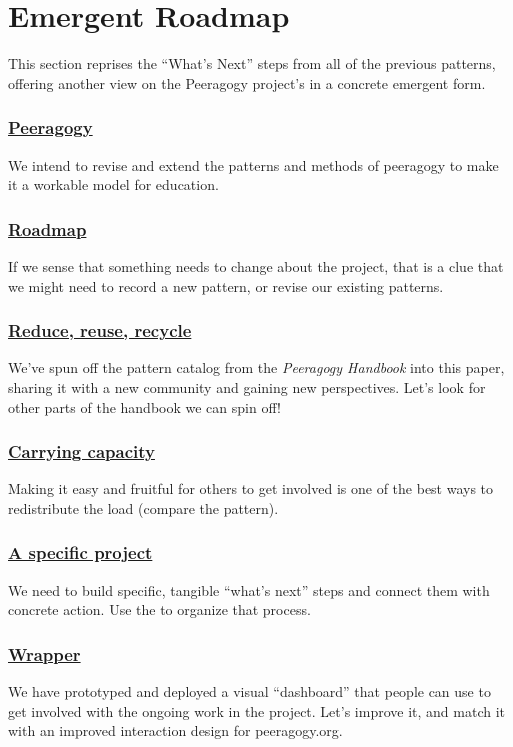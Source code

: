 \section{Emergent Roadmap} \label{sec:Distributed_Roadmap}

This section reprises the ``What's Next'' steps from all of the previous
patterns, offering another view on the Peeragogy project's
 in a concrete emergent form.

\subsubsection*{\hyperref[sec:Peeragogy]{Peeragogy}} 
 We intend to revise and extend the patterns and methods of peeragogy to make it a workable model for education.

\subsubsection*{\hyperref[sec:Roadmap]{Roadmap}} 
If we sense that something needs to change about the project, that is a clue that we might need to record a new pattern, or revise our existing patterns.

\subsubsection*{\hyperref[sec:Reduce, reuse, recycle]{Reduce, reuse, recycle}}
We've spun off the pattern catalog from the \emph{Peeragogy Handbook} into this paper, sharing it with a new community and gaining new perspectives.  Let's look for other parts of the handbook we can spin off!

\subsubsection*{\hyperref[sec:Carrying capacity]{Carrying capacity}} 
Making it easy and fruitful for others to get involved is one of the best ways to
redistribute the load (compare the
pattern).

\subsubsection*{\hyperref[sec:A specific project]{A specific project}}
We need to build specific, tangible ``what's next'' steps and connect them with concrete action. Use the  to organize that process. 

\subsubsection*{\hyperref[sec:Wrapper]{Wrapper}}
We have prototyped and deployed a visual ``dashboard'' that people can use to get involved with the ongoing work in the project.  Let's improve it, and match it with an improved interaction design for peeragogy.org.

